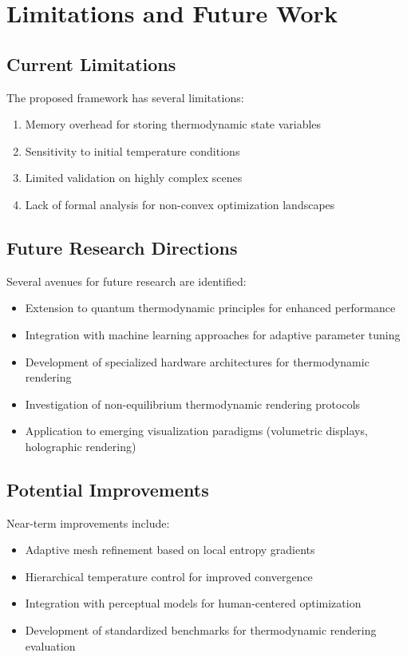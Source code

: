 \documentclass[12pt,a4paper]{article}
\begin{document}
\section{Limitations and Future Work}

\subsection{Current Limitations}

The proposed framework has several limitations:

\begin{enumerate}
\item Memory overhead for storing thermodynamic state variables
\item Sensitivity to initial temperature conditions
\item Limited validation on highly complex scenes
\item Lack of formal analysis for non-convex optimization landscapes
\end{enumerate}

\subsection{Future Research Directions}

Several avenues for future research are identified:

\begin{itemize}
\item Extension to quantum thermodynamic principles for enhanced performance
\item Integration with machine learning approaches for adaptive parameter tuning
\item Development of specialized hardware architectures for thermodynamic rendering
\item Investigation of non-equilibrium thermodynamic rendering protocols
\item Application to emerging visualization paradigms (volumetric displays, holographic rendering)
\end{itemize}

\subsection{Potential Improvements}

Near-term improvements include:

\begin{itemize}
\item Adaptive mesh refinement based on local entropy gradients
\item Hierarchical temperature control for improved convergence
\item Integration with perceptual models for human-centered optimization
\item Development of standardized benchmarks for thermodynamic rendering evaluation
\end{itemize}
\end{document}
